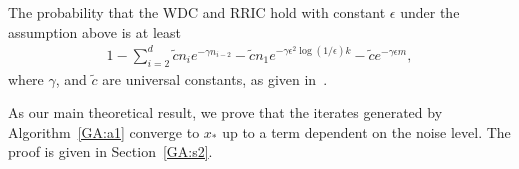 The probability that the WDC and RRIC hold with constant $\epsilon$ under the assumption above  is at least
\begin{align}
\label{eq:probestimate}
1 - \sum_{i = 2}^d \tilde{c} n_i e^{- \gamma n_{i-2}} - \tilde{c} n_1 e^{- \gamma \epsilon^2 \log(1/ \epsilon) k} - \tilde{c} e^{- \gamma \epsilon m},
\end{align}
where $\gamma$, and $\tilde{c}$ are universal constants, as given in~\cite[Proposition~4]{HV17}.
%

As our main theoretical result, we prove that the iterates generated by Algorithm~\ref{GA:a1} converge to $x_*$ up to a term dependent on the noise level. The proof is given in Section~\ref{GA:s2}.

